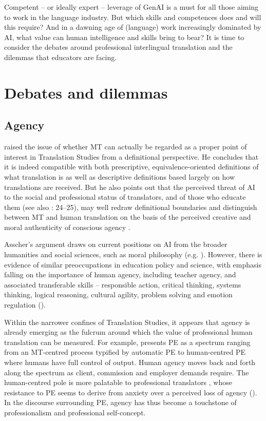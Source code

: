 \documentclass[output=paper]{langscibook}
\begin{document}
Competent – or ideally expert – leverage of GenAI is a must for all those aiming to work in the language industry. But which skills and competences does and will this require? And in a dawning age of (language) work increasingly dominated by AI, what value can human intelligence and skills bring to bear? It is time to consider the debates around professional interlingual translation and the dilemmas that educators are facing. 

\section{Debates and dilemmas}
\subsection{Agency}

\citet{asscher_position_2023} raised the issue of whether MT can actually be regarded as a proper point of interest in Translation Studies from a definitional perspective. He concludes that it is indeed compatible with both prescriptive, equivalence-oriented definitions of what translation is as well as descriptive definitions based largely on how translations are received. But he also points out that the perceived threat of AI to the social and professional status of translators, and of those who educate them (see also \citealt{elis_elis_2024}: 24--25), may well redraw definitional boundaries and distinguish between MT and human translation on the basis of the perceived creative and moral authenticity of conscious agency \citep[14--16]{asscher_position_2023}. 

Asscher’s argument draws on current positions on AI from the broader humanities and social sciences, such as moral philosophy (e.g. \citealt{sebastian_first-person_2021}). However, there is evidence of similar preoccupations in education policy and science, with emphasis falling on the importance of human agency, including teacher agency, and associated transferable skills – responsible action, critical thinking, systems thinking, logical reasoning, cultural agility, problem solving and emotion regulation (\citealt{gimpel_unlocking_2023, oecd_opportunities_2023}). 

Within the narrower confines of Translation Studies, it appears that agency is already emerging as the fulcrum around which the value of professional human translation can be measured. For example, \citet[327--329]{vieira_post-editing_2020} presents PE as a spectrum ranging from an MT-centred process typified by automatic PE to human-centred PE where humans have full control of output. Human agency moves back and forth along the spectrum as client, commission and employer demands require. The human-centred pole is more palatable to professional translators \citep[327]{vieira_post-editing_2020}, whose resistance to PE seems to derive from anxiety over a perceived loss of agency (\citealt{cadwell_resistance_2018, Sakamoto2019}). In the discourse surrounding PE, agency has thus become a touchstone of professionalism and professional self-concept. 
\end{document}
